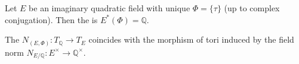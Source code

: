 \begin{proposition} \label{proposition:reflex_field_of_imaginary_quadratic_cm_type_is_rationals}
    Let $E$ be an imaginary quadratic field with unique  $\Phi = \{\tau\}$ (up to complex conjugation). Then the  is $E^*(\Phi) = \mathbb{Q}$.

    The  $N_{(E,\Phi)}: T_{\mathbb{Q}} \to T_E$ coincides with the morphism of tori induced by the field norm $N_{E/\mathbb{Q}}: E^\times \to \mathbb{Q}^\times$.
\end{proposition}

